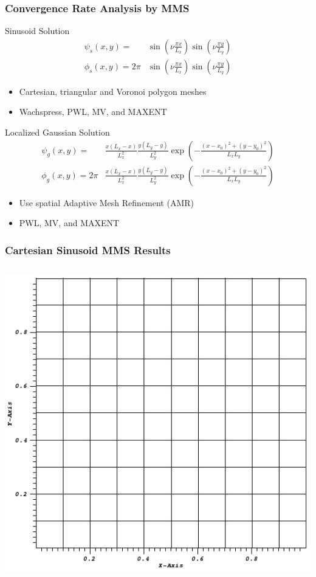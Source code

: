 \documentclass[compress,10pt]{beamer}
\begin{document}
\begin{frame}[t]
{
\frametitle{Convergence Rate Analysis by MMS}
{\small
\begin{block}{Sinusoid Solution}
\begin{equation*}
\begin{aligned}
\psi_s (x,y) = &\sin(\nu  \frac{\pi x}{L_x}) \sin(\nu  \frac{\pi y}{L_y}) \\ 
\phi_s (x,y) = 2 \pi &\sin(\nu  \frac{\pi x}{L_x}) \sin(\nu  \frac{\pi y}{L_y})
\end{aligned} 
\end{equation*}
\begin{itemize}
\item Cartesian, triangular and Voronoi polygon meshes
\item Wachspress, PWL, MV, and MAXENT
\end{itemize}
\end{block}
\begin{block}{Localized Gaussian Solution}
\begin{equation*}
\begin{aligned}
\psi_g (x,y) = & \frac{x (L_x - x)}{L_x^2} \frac{y (L_y - y)}{L_y^2} \exp(-\frac{(x-x_0)^2 + (y-y_0)^2}{L_x L_y}) \\ 
\phi_g (x,y) = 2 \pi &\frac{x (L_x - x)}{L_x^2} \frac{y (L_y - y)}{L_y^2} \exp(-\frac{(x-x_0)^2 + (y-y_0)^2}{L_x L_y})
\end{aligned} 
\end{equation*}
\begin{itemize}
\item Use spatial Adaptive Mesh Refinement (AMR)
\item PWL, MV, and MAXENT
\end{itemize}
\end{block}
}
}
{
\frametitle{Cartesian Sinusoid MMS Results}
\vspace{1.5cm}
\begin{columns}
{}\includegraphics[width=0.8\columnwidth]{images/cart_mesh.jpg}

\end{columns}}
\end{frame}
\end{document}
